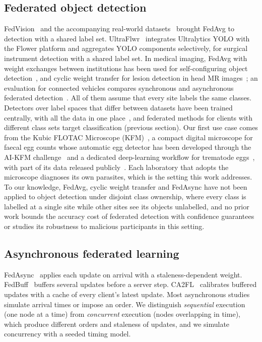 \documentclass[pdflatex,sn-mathphys-num]{sn-jnl}
\begin{document}
\subsection{Federated object detection}
FedVision~\cite{liu2020fedvision} and the accompanying real-world datasets~\cite{luo2019realworld} brought FedAvg to detection with a shared label set. UltraFlwr~\cite{li2025ultraflwr} integrates Ultralytics YOLO with the Flower platform and aggregates YOLO components selectively, for surgical instrument detection with a shared label set. In medical imaging, FedAvg with weight exchanges between institutions has been used for self-configuring object detection~\cite{rashidi2024federated}, and cyclic weight transfer for lesion detection in head MR images~\cite{yamada2024distributed}; an evaluation for connected vehicles compares synchronous and asynchronous federated detection~\cite{cherukuri2025cav}. All of them assume that every site labels the same classes. Detectors over label spaces that differ between datasets have been trained centrally, with all the data in one place~\cite{zhao2020unified}, and federated methods for clients with different class sets target classification (previous section). Our first use case comes from the Kubic FLOTAC Microscope (KFM)~\cite{cringoli2021kfm}, a compact digital microscope for faecal egg counts whose automatic egg detector has been developed through the AI-KFM challenge~\cite{capuozzo2024aikfm} and a dedicated deep-learning workflow for trematode eggs~\cite{capuozzo2026ijp}, with part of its data released publicly~\cite{capuozzo2025trematodes}. Each laboratory that adopts the microscope diagnoses its own parasites, which is the setting this work addresses. To our knowledge, FedAvg, cyclic weight transfer and FedAsync have not been applied to object detection under disjoint class ownership, where every class is labelled at a single site while other sites see its objects unlabelled, and no prior work bounds the accuracy cost of federated detection with confidence guarantees or studies its robustness to malicious participants in this setting.

\subsection{Asynchronous federated learning}
FedAsync~\cite{xie2019fedasync} applies each update on arrival with a staleness-dependent weight. FedBuff~\cite{nguyen2022fedbuff} buffers several updates before a server step. CA2FL~\cite{wang2024ca2fl} calibrates buffered updates with a cache of every client's latest update. Most asynchronous studies simulate arrival times or impose an order. We distinguish \emph{sequential} execution (one node at a time) from \emph{concurrent} execution (nodes overlapping in time), which produce different orders and staleness of updates, and we simulate concurrency with a seeded timing model.
\end{document}
